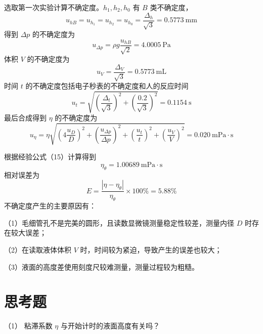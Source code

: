 \documentclass[12pt]{article}
\begin{document}
选取第一次实验计算不确定度。$h_1,h_2,h_0$ 有 $B$ 类不确定度，
\begin{equation}
    u_{hB}=u_{h_1}=u_{h_2}=u_{h_0}=\frac{\Delta_h}{\sqrt 3}= 0.5773\ \mathrm{mm}
\end{equation}
得到 $\Delta p$ 的不确定度为
\begin{equation}
    u_{\Delta p}=\rho g \frac{u_{hB}}{\sqrt{2}}=4.0005\ \mathrm{Pa}
\end{equation}
体积 $V$ 的不确定度为
\begin{equation}
    u_V=\frac{\Delta_V}{\sqrt 3}=0.5773\ \mathrm{mL}
\end{equation}
时间 $t$ 的不确定度包括电子秒表的不确定度和人的反应时间
\begin{equation}
    u_t=\sqrt{\left(\frac{\Delta_t}{\sqrt 3}\right)^2+\left(\frac{0.2}{\sqrt 3}\right)^2}=0.1154\ \mathrm{s}
\end{equation}
最后合成得到 $\eta$ 的不确定度为
\begin{equation}
    u_{\eta}=\eta\sqrt{\left(4\frac{u_D}{D} \right)^2+\left(\frac{u_{\Delta p}}{\Delta p} \right)^2+\left(\frac{u_t}{t} \right)^2+\left(\frac{u_V}{V} \right)^2}=0.020\ \mathrm{mPa\cdot s}
\end{equation}

根据经验公式（15）计算得到
\begin{equation}
    \eta_{\theta}=1.00689\ \mathrm{mPa\cdot s}
\end{equation}
相对误差为
\begin{equation}
    E=\frac{|\eta-\eta_{\theta}|}{\eta_{\theta}}\times 100\%=5.88\%
\end{equation}
不确定度产生的主要原因有：

（1）毛细管孔不是完美的圆形，且读数显微镜测量稳定性较差，测量内径 $D$ 时存在较大误差；

（2）在读取液体体积 $V$ 时，时间较为紧迫，导致产生的误差也较大；

（3）液面的高度差使用刻度尺较难测量，测量过程较为粗糙。

\section{思考题}

（1） 粘滞系数 $\eta$ 与开始计时的液面高度有关吗？
\end{document}
